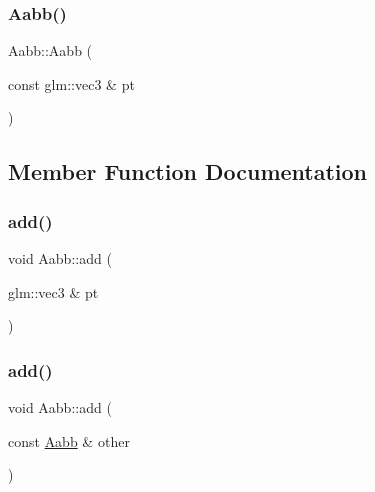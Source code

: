 \mbox{\label{class_aabb_a4123e8cc3781096f097a726f2e616fc6}} 
\subsubsection{\texorpdfstring{Aabb()}{Aabb()}\hspace{0.1cm}{\footnotesize\ttfamily [2/2]}}
{\footnotesize\ttfamily Aabb\+::\+Aabb (\begin{DoxyParamCaption}\item[{const glm\+::vec3 \&}]{pt }\end{DoxyParamCaption})\hspace{0.3cm}{\ttfamily [inline]}}



\subsection{Member Function Documentation}
\mbox{\label{class_aabb_ab7436a30136da670d0ef556c5a18ff65}} 
\subsubsection{\texorpdfstring{add()}{add()}\hspace{0.1cm}{\footnotesize\ttfamily [1/2]}}
{\footnotesize\ttfamily void Aabb\+::add (\begin{DoxyParamCaption}\item[{glm\+::vec3 \&}]{pt }\end{DoxyParamCaption})\hspace{0.3cm}{\ttfamily [inline]}}

\mbox{\label{class_aabb_a021412b1faf38a1c576748ff830dd76c}} 
\subsubsection{\texorpdfstring{add()}{add()}\hspace{0.1cm}{\footnotesize\ttfamily [2/2]}}
{\footnotesize\ttfamily void Aabb\+::add (\begin{DoxyParamCaption}\item[{const \mbox{\hyperlink{class_aabb}{Aabb}} \&}]{other }\end{DoxyParamCaption})\hspace{0.3cm}{\ttfamily [inline]}}

